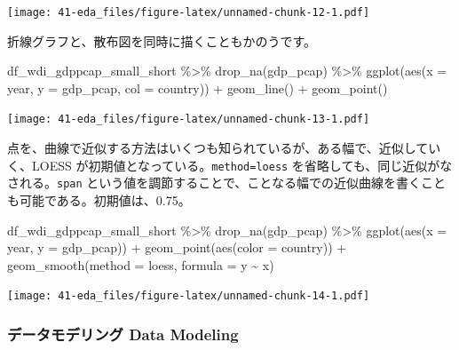 \documentclass[
]{bxjsbook}
\newenvironment{Shaded}{\begin{snugshade}}{\end{snugshade}}
\newcommand{\AttributeTok}[1]{\textcolor[rgb]{0.77,0.63,0.00}{#1}}
\newcommand{\FunctionTok}[1]{\textcolor[rgb]{0.00,0.00,0.00}{#1}}
\newcommand{\NormalTok}[1]{#1}
\newcommand{\SpecialCharTok}[1]{\textcolor[rgb]{0.00,0.00,0.00}{#1}}
\newcommand{\StringTok}[1]{\textcolor[rgb]{0.31,0.60,0.02}{#1}}
\theoremstyle{definition}
\theoremstyle{definition}
\theoremstyle{definition}
\theoremstyle{definition}
\theoremstyle{remark}
\begin{document}
\texttt{[image: 41-eda\_files/figure-latex/unnamed-chunk-12-1.pdf]}

折線グラフと、散布図を同時に描くこともかのうです。

\begin{Shaded}
\begin{Highlighting}[]
\NormalTok{df\_wdi\_gdppcap\_small\_short }\SpecialCharTok{\%\textgreater{}\%} \FunctionTok{drop\_na}\NormalTok{(gdp\_pcap) }\SpecialCharTok{\%\textgreater{}\%}
  \FunctionTok{ggplot}\NormalTok{(}\FunctionTok{aes}\NormalTok{(}\AttributeTok{x =}\NormalTok{ year, }\AttributeTok{y =}\NormalTok{ gdp\_pcap, }\AttributeTok{col =}\NormalTok{ country)) }\SpecialCharTok{+} \FunctionTok{geom\_line}\NormalTok{() }\SpecialCharTok{+}
  \FunctionTok{geom\_point}\NormalTok{()}
\end{Highlighting}
\end{Shaded}

\texttt{[image: 41-eda\_files/figure-latex/unnamed-chunk-13-1.pdf]}

点を、曲線で近似する方法はいくつも知られているが、ある幅で、近似していく、LOESS が初期値となっている。\texttt{method=\textquotesingle{}loess\textquotesingle{}} を省略しても、同じ近似がなされる。\texttt{span} という値を調節することで、ことなる幅での近似曲線を書くことも可能である。初期値は、0.75。

\begin{Shaded}
\begin{Highlighting}[]
\NormalTok{df\_wdi\_gdppcap\_small\_short }\SpecialCharTok{\%\textgreater{}\%} \FunctionTok{drop\_na}\NormalTok{(gdp\_pcap) }\SpecialCharTok{\%\textgreater{}\%}
  \FunctionTok{ggplot}\NormalTok{(}\FunctionTok{aes}\NormalTok{(}\AttributeTok{x =}\NormalTok{ year, }\AttributeTok{y =}\NormalTok{ gdp\_pcap)) }\SpecialCharTok{+} 
  \FunctionTok{geom\_point}\NormalTok{(}\FunctionTok{aes}\NormalTok{(}\AttributeTok{color =}\NormalTok{ country)) }\SpecialCharTok{+} 
  \FunctionTok{geom\_smooth}\NormalTok{(}\AttributeTok{method =} \StringTok{\textquotesingle{}loess\textquotesingle{}}\NormalTok{, }\AttributeTok{formula =} \StringTok{\textquotesingle{}y \textasciitilde{} x\textquotesingle{}}\NormalTok{)}
\end{Highlighting}
\end{Shaded}

\texttt{[image: 41-eda\_files/figure-latex/unnamed-chunk-14-1.pdf]}

\hypertarget{ux30c7ux30fcux30bfux30e2ux30c7ux30eaux30f3ux30b0-data-modeling}{%
\subsubsection{データモデリング Data Modeling}\label{ux30c7ux30fcux30bfux30e2ux30c7ux30eaux30f3ux30b0-data-modeling}}
\end{document}
